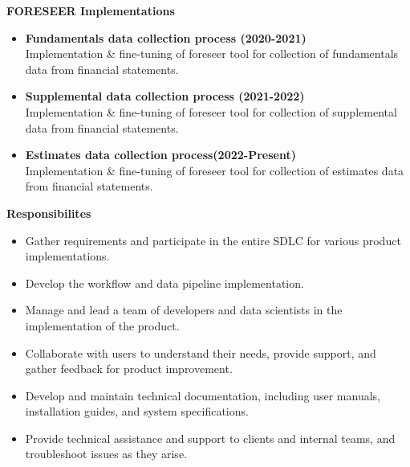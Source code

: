 \documentclass[a4paper]{article}
\begin{document}
\textbf{FORESEER Implementations} \\
\begin{itemize} \itemsep 1pt

\item \textbf{Fundamentals data collection process (2020-2021)} \\
Implementation \& fine-tuning of foreseer tool for collection of fundamentals data from financial statements. \\ 
\vspace*{2mm}
\item \textbf{Supplemental data collection process (2021-2022)} \\
Implementation \& fine-tuning of foreseer tool for collection of supplemental data from financial statements. \\ 
\vspace*{2mm}
\item \textbf{Estimates data collection process(2022-Present)} \\
Implementation \& fine-tuning of foreseer tool for collection of estimates data from financial statements. \\ 
\end{itemize}
\vspace{1mm}
\textbf{Responsibilites} \\
\begin{itemize} \itemsep 1pt
\item Gather requirements and participate in the entire SDLC for various product implementations.
\item Develop the workflow and data pipeline implementation.
\item Manage and lead a team of developers and data scientists in the implementation of the product.
\item Collaborate with users to understand their needs, provide support, and gather feedback for product improvement.
\item Develop and maintain technical documentation, including user manuals, installation guides, and system specifications.
\item Provide technical assistance and support to clients and internal teams, and troubleshoot issues as they arise.
\end{itemize}

\vspace*{2mm}
\end{document}
